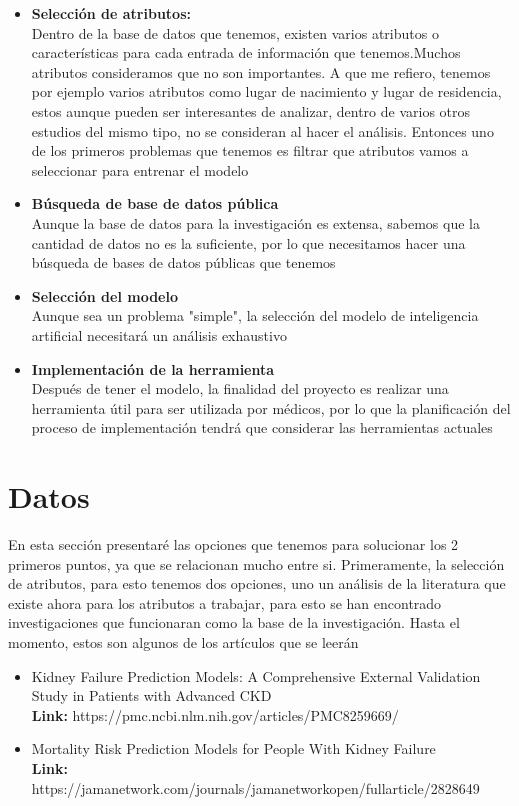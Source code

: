 \documentclass{article}
\begin{document}
\begin{itemize}
    \item \textbf{Selección de atributos:}\\
        Dentro de la base de datos que tenemos, existen varios atributos o
        características para cada entrada de información que tenemos.Muchos
        atributos consideramos que no son importantes. A que me refiero, tenemos
        por ejemplo varios atributos como lugar de nacimiento y lugar de
        residencia, estos aunque pueden ser interesantes de analizar, dentro de
        varios otros estudios del mismo tipo, no se consideran al hacer el
        análisis. Entonces uno de los primeros problemas que tenemos es filtrar
        que atributos vamos a seleccionar para entrenar el modelo
    \item \textbf{Búsqueda de base de datos pública}\\
        Aunque la base de datos para la investigación es extensa, sabemos que
        la cantidad de datos no es la suficiente, por lo que necesitamos hacer
        una búsqueda de bases de datos públicas que tenemos
    \item \textbf{Selección del modelo}\\
        Aunque sea un problema "simple", la selección del modelo de inteligencia
        artificial necesitará un análisis exhaustivo
    \item \textbf{Implementación de la herramienta}\\
        Después de tener el modelo, la finalidad del proyecto es realizar una
        herramienta útil para ser utilizada por médicos, por lo que la
        planificación del proceso de implementación tendrá que considerar las
        herramientas actuales
\end{itemize}
\section{ Datos }
En esta sección presentaré las opciones que tenemos para solucionar los 2
primeros puntos, ya que se relacionan mucho entre si. Primeramente, la
selección de atributos, para esto tenemos dos opciones, uno un análisis de la
literatura que existe ahora para los atributos a trabajar, para esto se han
encontrado investigaciones que funcionaran como la base de la investigación.
Hasta el momento, estos son algunos de los artículos que se leerán

\begin{itemize}
    \item Kidney Failure Prediction Models: A Comprehensive External Validation Study in
        Patients with Advanced CKD\\
        \textbf{Link:} https://pmc.ncbi.nlm.nih.gov/articles/PMC8259669/
    \item Mortality Risk Prediction Models for People With Kidney Failure\\
        \textbf{Link:} https://jamanetwork.com/journals/jamanetworkopen/fullarticle/2828649
\end{itemize}
\end{document}
